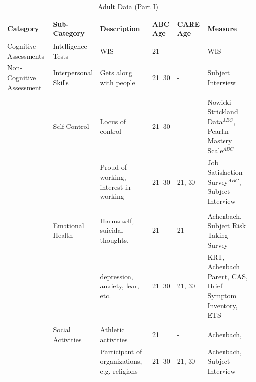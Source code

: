 \documentclass[static]{JJH-Beamer}
\begin{document}
\begin{frame}

\begin{table}[H]
\caption{Adult Data (Part I)} \label{tab:adultvars_1}							
\begin{center}
\begin{tiny}					
\begin{tabular}{L{1.2cm} C{1.4cm} C{2.5cm} C{.8cm} C{.8cm} C{2.9cm}}										
\toprule
\textbf{Category}	&	\textbf{Sub-Category}	&	\textbf{Description}	&	\textbf{ABC Age}  	&  \textbf{CARE Age}  & 	\textbf{Measure}	\\ \midrule
Cognitive Assessments   	&	       Intelligence Tests      	&	       WIS     	&	21	&	-	&	       WIS     \\
\midrule										
Non-Cognitive Assessment        	&	       Interpersonal Skills    	&	       Gets along with people  	&	       21, 30  	&	-	&	       Subject Interview   \\
\\										
        	&	       Self-Control    	&	       Locus of control        	&	       21, 30  	&	-	&	       Nowicki-Strickland Data$^{ABC}$, Pearlin Mastery Scale$^{ABC}$  \\
        	&	               	&	       Proud of working, interest in working   	&	       21, 30  	&	21, 30	&	       Job Satisfaction Survey$^{ABC}$, Subject Interview       \\
\\										
        	&	       Emotional Health        	&	       Harms self, suicidal thoughts,	&	21	&	21	&	       Achenbach,  Subject Risk Taking Survey   \\
        	&	               	&	       depression, anxiety, fear, etc. 	&	       21, 30  	&	21, 30	&	       KRT, Achenbach Parent,  CAS, Brief Symptom Inventory, ETS\\
\\										
        	&	       Social Activities       	&	       Athletic activities     	&	21	&	-	&	       Achenbach,  \\
        	&	               	&	       Participant of organizations, e.g. religions    	&	       21, 30  	&	21, 30	&	       Achenbach, Subject Interview        \\
\bottomrule							
\end{tabular}										
\end{tiny}
\end{center}							
\end{table}

\end{frame}
\end{document}
